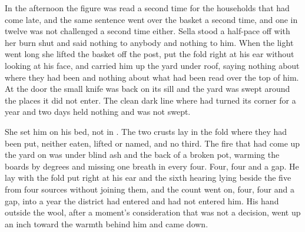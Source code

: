 In the afternoon the figure was read a second time for the households that had come late, and the same sentence went over the basket a second time, and one in twelve was not challenged a second time either. Sella stood a half-pace off with her burn shut and said nothing to anybody and nothing to him. When the light went long she lifted the basket off the post, put the fold right at his ear without looking at his face, and carried him up the yard under  roof, saying nothing about where they had been and nothing about what had been read over the top of him. At the door the small knife was back on its sill and the yard was swept around the places it did not enter. The clean dark line where  had turned its corner for a year and two days held nothing and was not swept.

She set him on his bed, not in . The two crusts lay in the fold where they had been put, neither eaten, lifted or named, and no third. The fire that had come up the yard on  was under blind ash and the back of a broken pot, warming the boards by degrees and missing one breath in every four. Four, four and a gap. He lay with the fold put right at his ear and the sixth hearing lying beside the five from four sources without joining them, and the count went on, four, four and a gap, into a year the district had entered and had not entered him. His hand outside the wool, after a moment's consideration that was not a decision, went up an inch toward the warmth behind him and came down.
